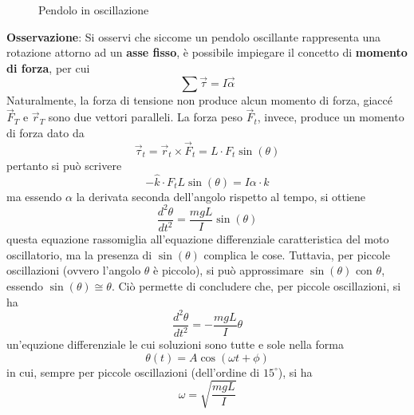 \documentclass[a4paper]{extarticle}
\begin{document}
\begin{figure}[H]
  \def\L{2.8}  %
  \def\ang{28} %
  \def\R{0.25} %
  \def\F{1.0}  %
  \caption{Pendolo in oscillazione}
  \label{fig:pendolo_oscillazione}
\end{figure}

\vspace{1em}
\noindent
\textbf{Osservazione}: Si osservi che siccome un pendolo oscillante rappresenta una rotazione attorno ad un \textbf{asse fisso}, è possibile impiegare il concetto di \textbf{momento di forza}, per cui
\[\sum \vec \tau = I \vec \alpha\]
Naturalmente, la forza di tensione non produce alcun momento di forza, giaccé $\vec F_T$ e $\vec r_T$ sono due vettori paralleli. La forza peso $\vec F_t$, invece, produce un momento di forza dato da
\[\vec \tau_t = \vec r_t \times \vec F_t = L \cdot F_t \sin(\theta)\]
pertanto si può scrivere
\[-\hat{k} \cdot F_t L \sin(\theta) = I \alpha \cdot \hat{k}\]
ma essendo $\alpha$ la derivata seconda dell'angolo rispetto al tempo, si ottiene
\[\frac{d^2 \theta}{dt^2} = \frac{mg L}{I} \sin(\theta)\]
questa equazione rassomiglia all'equazione differenziale caratteristica del moto oscillatorio, ma la presenza di $\sin(\theta)$ complica le cose. Tuttavia, per piccole oscillazioni (ovvero l'angolo $\theta$ è piccolo), si può approssimare $\sin(\theta)$ con $\theta$, essendo $\sin(\theta) \cong \theta$. Ciò permette di concludere che, per piccole oscillazioni, si ha
\[\frac{d^2 \theta}{dt^2} = - \frac{mg L}{I} \theta\]
un'equzione differenziale le cui soluzioni sono tutte e sole nella forma
\[\theta(t) = A \cos(\omega t + \phi)\]
in cui, sempre per piccole oscillazioni (dell'ordine di $15^\circ$), si ha
\[\boxed{\omega = \sqrt{\frac{mg L}{I}}}\]
\end{document}
